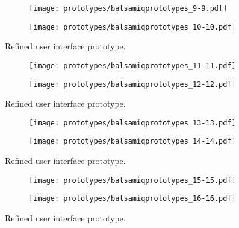 \documentclass{l4proj}
\begin{document}
\begin{appendices}
\begin{figure}[!ht]
    \centering
    \begin{subfigure}[b]{0.45\textwidth}
        \texttt{[image: prototypes/balsamiqprototypes\_9-9.pdf]}
        \label{fig:ref5}
    \end{subfigure}
    \begin{subfigure}[b]{0.45\textwidth}
        \texttt{[image: prototypes/balsamiqprototypes\_10-10.pdf]}
        \label{fig:ref6}
    \end{subfigure} 
    \caption{Refined user interface prototype.}
    \label{fig:prototypes4}
\end{figure}

\begin{figure}[!ht]
    \centering
    \begin{subfigure}[b]{0.45\textwidth}
        \texttt{[image: prototypes/balsamiqprototypes\_11-11.pdf]}
        \label{fig:ref7}
    \end{subfigure}
    \begin{subfigure}[b]{0.45\textwidth}
        \texttt{[image: prototypes/balsamiqprototypes\_12-12.pdf]}
        \label{fig:ref8}
    \end{subfigure}    
    \caption{Refined user interface prototype.}
    \label{fig:prototypes5}
\end{figure}

\begin{figure}[!ht]
    \centering
    \begin{subfigure}[b]{0.45\textwidth}
        \texttt{[image: prototypes/balsamiqprototypes\_13-13.pdf]}
        \label{fig:ref9}
    \end{subfigure}
    \begin{subfigure}[b]{0.45\textwidth}
        \texttt{[image: prototypes/balsamiqprototypes\_14-14.pdf]}
        \label{fig:ref10}
    \end{subfigure}    
    \caption{Refined user interface prototype.}
    \label{fig:prototypes6}
\end{figure}

\begin{figure}[!ht]
    \centering
    \begin{subfigure}[b]{0.45\textwidth}
        \texttt{[image: prototypes/balsamiqprototypes\_15-15.pdf]}
        \label{fig:ref11}
    \end{subfigure}
    \begin{subfigure}[b]{0.45\textwidth}
        \texttt{[image: prototypes/balsamiqprototypes\_16-16.pdf]}
        \label{fig:ref12}
    \end{subfigure} 
    \caption{Refined user interface prototype.}
    \label{fig:prototypes7}
\end{figure}


\end{appendices}
\end{document}
